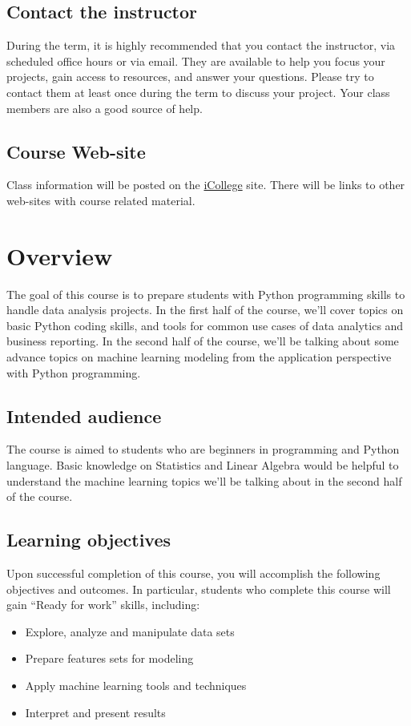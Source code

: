 \documentclass{article}
\begin{document}
\subsection{Contact the instructor}
During the term, it is highly recommended that you contact the instructor, via scheduled office hours or via email. They are available to help you focus your projects, gain access to resources, and answer your questions. Please try to contact them at least once during the term to discuss your project. Your class members are also a good source of help.


\subsection{Course Web-site}
Class information will be posted on the \href{https://icollege.gsu.edu/}{iCollege} site. There will be links to other web-sites with course related material.


\section{Overview}
The goal of this course is to prepare students with Python programming skills to handle data analysis projects. In the first half of the course, we'll cover topics on basic Python coding skills, and tools for common use cases of data analytics and business reporting. In the second half of the course, we'll be talking about some advance topics on machine learning modeling from the application perspective with Python programming.

\subsection{Intended audience}
The course is aimed to students who are beginners in programming and Python language. Basic knowledge on Statistics and Linear Algebra would be helpful to understand the machine learning topics we'll be talking about in the second half of the course.


\subsection{Learning objectives}
Upon successful completion of this course, you will accomplish the following objectives and outcomes. In particular, students who complete this course will gain “Ready for work” skills, including:\\
\begin{itemize}
  \item Explore, analyze and manipulate data sets
  \item Prepare features sets for modeling
  \item Apply machine learning tools and techniques
  \item Interpret and present results
\end{itemize}
\end{document}
